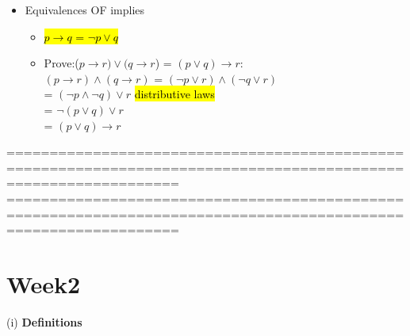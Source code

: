 \documentclass{article}
\begin{document}
\begin{itemize}
================================================================================================================
\newpage
================================================================================================================

\item{Equivalences OF implies}
\begin{itemize}
\item \hl{$p \rightarrow q$ = $ \neg p \lor q$}

\item Prove:($p \rightarrow r) \lor (q \rightarrow r$) = $(p \lor q) \rightarrow r$:\\
$(p \rightarrow r) \land (q \rightarrow r)$ = $(\neg p \lor r) \land (\neg q \lor r)$\\
= $(\neg p\land \neg q) \lor r$  
 \hl{distributive laws}\\
= $\neg (p \lor q) \lor  r$\\
= $(p \lor q) \rightarrow r$
\end{itemize}

\end{itemize}

================================================================================================================
\newpage
================================================================================================================

\section{Week2}

(i) \textbf{Definitions}

\end{document}
